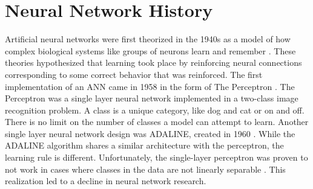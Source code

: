 











\section{Neural Network History}


Artificial neural networks were first theorized in the 1940s as a model of how complex biological systems like groups of neurons learn and remember \cite{Pitts1943, Hebb1949}. These theories hypothesized that learning took place by reinforcing neural connections corresponding to some correct behavior that was reinforced. The first implementation of an ANN came in 1958 in the form of The Perceptron \cite{Rosenblatt1958, Rosenblatt1962}. The Perceptron was a single layer neural network implemented in a two-class image recognition problem. A class is a unique category, like dog and cat or on and off. There is no limit on the number of classes a model can attempt to learn. Another single layer neural network design was ADALINE, created in 1960 \cite{Widrow1960}. While the ADALINE algorithm shares a similar architecture with the perceptron, the learning rule is different. Unfortunately, the single-layer perceptron was proven to not work in cases where classes in the data are not linearly separable \cite{Minsky1969}. This realization led to a decline in neural network research.

